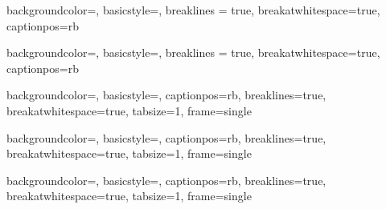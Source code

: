 \newenvironment{DOS_Font}{\footnotesize\color{black}\rmfamily}{\par}

{
    backgroundcolor=\color{white},
    basicstyle=\footnotesize\color{black}\rmfamily,
    breaklines = true,
    breakatwhitespace=true,
    captionpos=rb
}

{
    backgroundcolor=\color{white},
    basicstyle=\footnotesize\color{black}\rmfamily,
    breaklines = true,
    breakatwhitespace=true,
    captionpos=rb
}

{
    backgroundcolor=\color{white},
    basicstyle=\footnotesize\color{black}\rmfamily,
    captionpos=rb,
    breaklines=true,
    breakatwhitespace=true,
    tabsize=1,
    frame=single
}

{
    backgroundcolor=\color{white},
    basicstyle=\tiny\color{black}\rmfamily,
    captionpos=rb,
    breaklines=true,
    breakatwhitespace=true,
    tabsize=1,
    frame=single
}

{
    backgroundcolor=\color{white},
    basicstyle=\scriptsize\color{black}\rmfamily,
    captionpos=rb,
    breaklines=true,
    breakatwhitespace=true,
    tabsize=1,
    frame=single
}